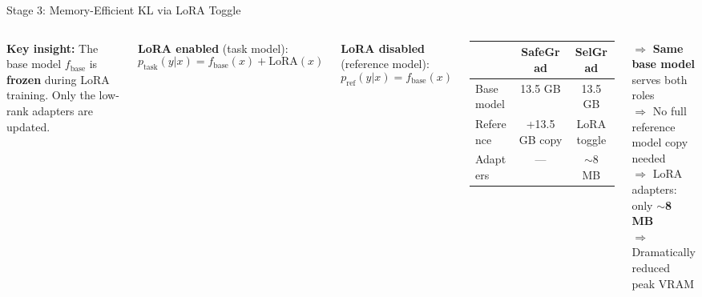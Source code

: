 \documentclass[aspectratio=169, 11pt]{beamer}
\begin{document}
\begin{frame}{Stage 3: Memory-Efficient KL via LoRA Toggle}
\vspace{4pt}
\begin{columns}[c]
\small
\textbf{Key insight:} The base model $f_{\text{base}}$ is \textbf{frozen} during LoRA training. Only the low-rank adapters are updated.

\vspace{8pt}
\textbf{LoRA enabled} (task model):
\vspace{-4pt}
\begin{equation*}
p_{\text{task}}(y|x) = f_{\text{base}}(x) + \text{LoRA}(x)
\end{equation*}
\vspace{-8pt}

\textbf{LoRA disabled} (reference model):
\vspace{-4pt}
\begin{equation*}
p_{\text{ref}}(y|x) = f_{\text{base}}(x)
\end{equation*}

\centering
\renewcommand{\arraystretch}{1.3}
\begin{tabular}{lcc}
\toprule
& \textbf{SafeGrad} & \textbf{SelGrad} \\
\midrule
Base model & 13.5 GB & 13.5 GB \\
Reference & \textcolor{dangerred}{+13.5 GB copy} & \textcolor{safegreen}{LoRA toggle} \\
Adapters & --- & $\sim$8 MB \\
\bottomrule
\end{tabular}
\vspace{8pt}

$\Rightarrow$ \textbf{Same base model} serves both roles\\[2pt]
$\Rightarrow$ No full reference model copy needed\\[2pt]
$\Rightarrow$ LoRA adapters: only \textbf{$\sim$8 MB}\\[2pt]
$\Rightarrow$ Dramatically reduced peak VRAM
\end{columns}
\end{frame}
\end{document}
